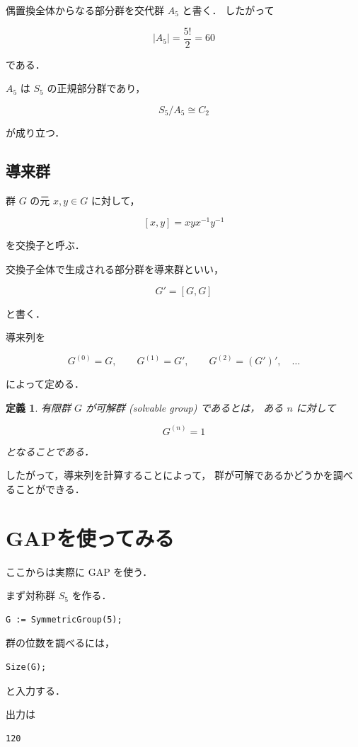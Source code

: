 \documentclass[a4paper,11pt]{jsarticle}
\newtheorem{definition}{定義}[section]
\begin{document}
偶置換全体からなる部分群を交代群 $A_5$ と書く．
したがって

$$
|A_5|=\frac{5!}{2}=60
$$

である．

$A_5$ は $S_5$ の正規部分群であり，

$$
S_5/A_5\cong C_2
$$

が成り立つ．

\subsection{導来群}

群 $G$ の元 $x,y\in G$ に対して，

$$
[x,y]=xyx^{-1}y^{-1}
$$

を交換子と呼ぶ．

交換子全体で生成される部分群を導来群といい，

$$
G'=[G,G]
$$

と書く．

導来列を

$$
G^{(0)}=G,\qquad
G^{(1)}=G',\qquad
G^{(2)}=(G')',\quad\ldots
$$

によって定める．

\begin{definition}
有限群 $G$ が可解群 (solvable group) であるとは，
ある $n$ に対して

$$
G^{(n)}=1
$$

となることである．
\end{definition}

したがって，導来列を計算することによって，
群が可解であるかどうかを調べることができる．

\section{GAPを使ってみる}

ここからは実際に GAP を使う．

まず対称群 $S_5$ を作る．

\begin{lstlisting}
G := SymmetricGroup(5);
\end{lstlisting}

群の位数を調べるには，

\begin{lstlisting}
Size(G);
\end{lstlisting}

と入力する．

出力は

\begin{lstlisting}
120
\end{lstlisting}
\end{document}
